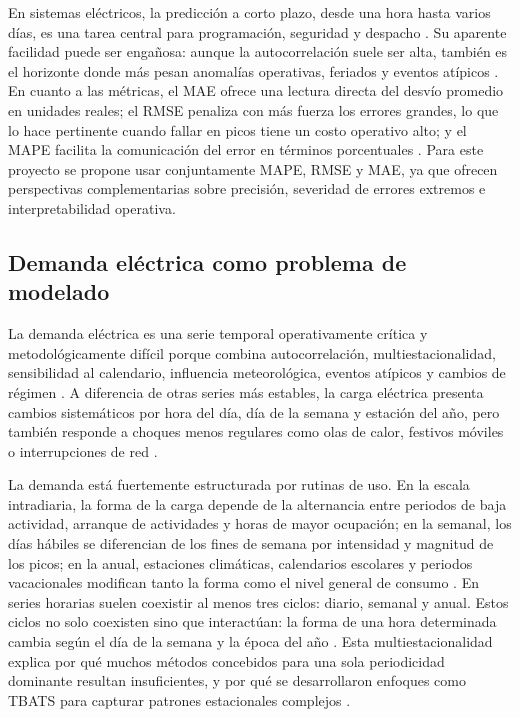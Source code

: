 En sistemas eléctricos, la predicción a corto plazo, desde una hora hasta varios días, es una tarea central para programación, seguridad y despacho \parencite{gross1987}. Su aparente facilidad puede ser engañosa: aunque la autocorrelación suele ser alta, también es el horizonte donde más pesan anomalías operativas, feriados y eventos atípicos \parencite{hippert2001}. En cuanto a las métricas, el MAE ofrece una lectura directa del desvío promedio en unidades reales; el RMSE penaliza con más fuerza los errores grandes, lo que lo hace pertinente cuando fallar en picos tiene un costo operativo alto; y el MAPE facilita la comunicación del error en términos porcentuales \parencite{hyndman2006}. Para este proyecto se propone usar conjuntamente MAPE, RMSE y MAE, ya que ofrecen perspectivas complementarias sobre precisión, severidad de errores extremos e interpretabilidad operativa.

\subsection{Demanda eléctrica como problema de modelado}

La demanda eléctrica es una serie temporal operativamente crítica y metodológicamente difícil porque combina autocorrelación, multiestacionalidad, sensibilidad al calendario, influencia meteorológica, eventos atípicos y cambios de régimen \parencite{alfares2002,hippert2001}. A diferencia de otras series más estables, la carga eléctrica presenta cambios sistemáticos por hora del día, día de la semana y estación del año, pero también responde a choques menos regulares como olas de calor, festivos móviles o interrupciones de red \parencite{alfares2002,hong2020}.

La demanda está fuertemente estructurada por rutinas de uso. En la escala intradiaria, la forma de la carga depende de la alternancia entre periodos de baja actividad, arranque de actividades y horas de mayor ocupación; en la semanal, los días hábiles se diferencian de los fines de semana por intensidad y magnitud de los picos; en la anual, estaciones climáticas, calendarios escolares y periodos vacacionales modifican tanto la forma como el nivel general de consumo \parencite{alfares2002,hippert2001}. En series horarias suelen coexistir al menos tres ciclos: diario, semanal y anual. Estos ciclos no solo coexisten sino que interactúan: la forma de una hora determinada cambia según el día de la semana y la época del año \parencite{hyndman2021}. Esta multiestacionalidad explica por qué muchos métodos concebidos para una sola periodicidad dominante resultan insuficientes, y por qué se desarrollaron enfoques como TBATS para capturar patrones estacionales complejos \parencite{delivera2011}.

